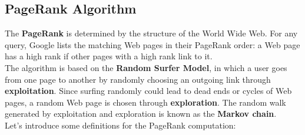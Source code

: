 \documentclass{article}
\begin{document}
\subsection{PageRank Algorithm}
The \textbf{PageRank} is determined by the structure of the World Wide Web. For any query, Google lists the matching Web pages in their PageRank order: a Web page has a high rank if other pages with a high rank link to it. \\
The algorithm is based on the \textbf{Random Surfer Model}, in which a user goes from one page to another by randomly choosing an outgoing link through \textbf{exploitation}. Since surfing randomly could lead to dead ends or cycles of Web pages, a random Web page is chosen through \textbf{exploration}. The random walk generated by exploitation and exploration is known as the \textbf{Markov chain}. \\ 
Let's introduce some definitions for the PageRank computation:
\end{document}

